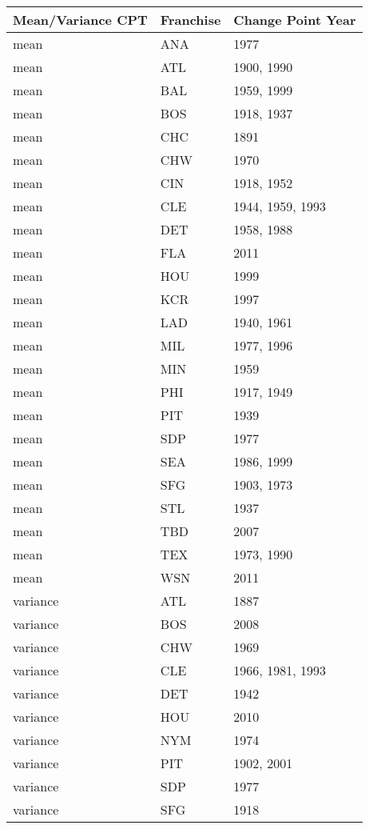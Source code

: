 \documentclass[
  12pt,
]{article}
\begin{document}
\begin{longtable}[]{@{}lll@{}}
\toprule\noalign{}
Mean/Variance CPT & Franchise & Change Point Year \\
\midrule\noalign{}
\endhead
\bottomrule\noalign{}
\endlastfoot
mean & ANA & 1977 \\
mean & ATL & 1900, 1990 \\
mean & BAL & 1959, 1999 \\
mean & BOS & 1918, 1937 \\
mean & CHC & 1891 \\
mean & CHW & 1970 \\
mean & CIN & 1918, 1952 \\
mean & CLE & 1944, 1959, 1993 \\
mean & DET & 1958, 1988 \\
mean & FLA & 2011 \\
mean & HOU & 1999 \\
mean & KCR & 1997 \\
mean & LAD & 1940, 1961 \\
mean & MIL & 1977, 1996 \\
mean & MIN & 1959 \\
mean & PHI & 1917, 1949 \\
mean & PIT & 1939 \\
mean & SDP & 1977 \\
mean & SEA & 1986, 1999 \\
mean & SFG & 1903, 1973 \\
mean & STL & 1937 \\
mean & TBD & 2007 \\
mean & TEX & 1973, 1990 \\
mean & WSN & 2011 \\
variance & ATL & 1887 \\
variance & BOS & 2008 \\
variance & CHW & 1969 \\
variance & CLE & 1966, 1981, 1993 \\
variance & DET & 1942 \\
variance & HOU & 2010 \\
variance & NYM & 1974 \\
variance & PIT & 1902, 2001 \\
variance & SDP & 1977 \\
variance & SFG & 1918 \\
\end{longtable}
\end{document}
